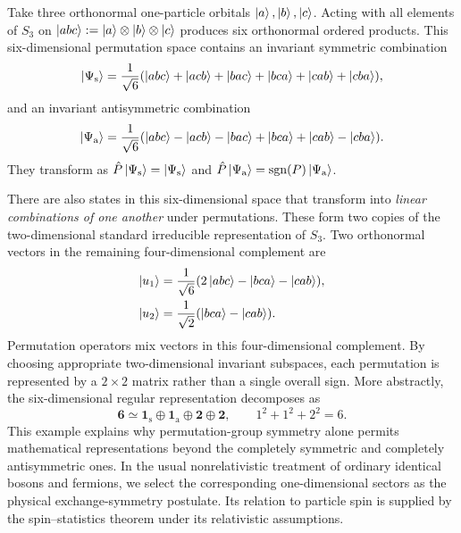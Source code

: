Take three orthonormal one-particle orbitals $\left|a\right\rangle,\left|b\right\rangle,\left|c\right\rangle$. Acting with all elements of $S_3$ on $\left|abc\right\rangle:=\left|a\right\rangle\otimes\left|b\right\rangle\otimes\left|c\right\rangle$ produces six orthonormal ordered products. This six-dimensional permutation space contains an invariant symmetric combination
\begin{equation}
\left|\Psi_{\mathrm s}\right\rangle=\frac1{\sqrt6}
   (\left|abc\right\rangle+\left|acb\right\rangle+\left|bac\right\rangle+\left|bca\right\rangle+\left|cab\right\rangle+\left|cba\right\rangle),
\end{equation}
and an invariant antisymmetric combination
\begin{equation}
\left|\Psi_{\mathrm a}\right\rangle=\frac1{\sqrt6}
   (\left|abc\right\rangle-\left|acb\right\rangle-\left|bac\right\rangle+\left|bca\right\rangle+\left|cab\right\rangle-\left|cba\right\rangle).
\end{equation}
They transform as $\hat{P}\left|\Psi_{\mathrm s}\right\rangle=\left|\Psi_{\mathrm s}\right\rangle$ and $\hat{P}\left|\Psi_{\mathrm a}\right\rangle=\operatorname{sgn}(P)\left|\Psi_{\mathrm a}\right\rangle$.

There are also states in this six-dimensional space that transform into \emph{linear combinations of one another} under permutations. These form two copies of the two-dimensional standard irreducible representation of $S_3$. Two orthonormal vectors in the remaining four-dimensional complement are
\begin{equation}
\begin{aligned}
\left|u_1\right\rangle&=\frac{1}{\sqrt6}
   (2\left|abc\right\rangle-\left|bca\right\rangle-\left|cab\right\rangle),\\
\left|u_2\right\rangle&=\frac{1}{\sqrt2}(\left|bca\right\rangle-\left|cab\right\rangle).
\end{aligned}
\end{equation}
Permutation operators mix vectors in this four-dimensional complement. By choosing appropriate two-dimensional invariant subspaces, each permutation is represented by a $2\times2$ matrix rather than a single overall sign. More abstractly, the six-dimensional regular representation decomposes as
\begin{equation}
\mathbf6\simeq\mathbf1_{\mathrm s}\oplus
\mathbf1_{\mathrm a}\oplus\mathbf2\oplus\mathbf2,\qquad
1^2+1^2+2^2=6.
\end{equation}
This example explains why permutation-group symmetry alone permits mathematical representations beyond the completely symmetric and completely antisymmetric ones. In the usual nonrelativistic treatment of ordinary identical bosons and fermions, we select the corresponding one-dimensional sectors as the physical exchange-symmetry postulate. Its relation to particle spin is supplied by the spin--statistics theorem under its relativistic assumptions.

